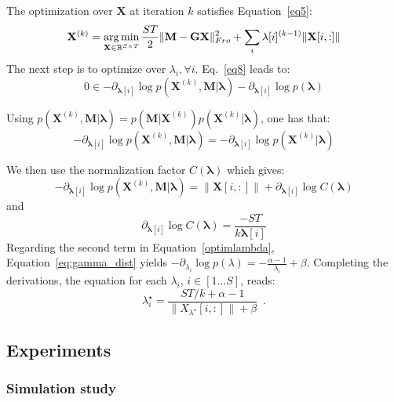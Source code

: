 The optimization over $\mathbf{X}$ at iteration $k$ satisfies Equation~\eqref{eq5}: %
\begin{equation*}	
\mathbf{X}^{(k)}=\mathop{\mathrm{arg}\,\mathrm{min}}_{\mathbf{X}\in\mathbb{R}^{S\times T}} \frac{ST}{2}\|\mathbf{M}-\mathbf{GX}\|_{Fro}^2 + \sum_{i} \mathbf{\lambda}[i]^{(k-1)}\|\mathbf{X}[i,:]\|
\end{equation*}
The next step is to optimize over $\lambda_i, \forall i$. Eq.~\eqref{eq8} leads to:
\begin{equation} \label{optimlambda}
0\in -\partial_{\mathbf{\lambda}[i]} \log p(\mathbf{X}^{(k)},\mathbf{M}|\mathbf{\lambda}) -\partial_{\mathbf{\lambda}[i]} \log p(\mathbf{\lambda})
\end{equation} 

Using $p(\mathbf{X}^{(k)},\mathbf{M}|\mathbf{\lambda})=p(\mathbf{M}|\mathbf{X}^{(k)})p(\mathbf{X}^{(k)}|\mathbf{\lambda})$, one has that:
\begin{equation}
-\partial_{\mathbf{\lambda}[i]} \log p(\mathbf{X}^{(k)}, \mathbf{M}|\mathbf{\lambda}) = -\partial_{\mathbf{\lambda}[i]} \log p(\mathbf{X}^{(k)}|\mathbf{\lambda})
\end{equation}

 We then use the normalization factor $C(\mathbf{\lambda})$ which gives:\\
\begin{equation}
 - \partial_{\mathbf{\lambda}[i]} \log p(\mathbf{X}^{(k)}, \mathbf{M}|\mathbf{\lambda})=\|\mathbf{X}[i,:]\| + \partial_{\mathbf{\lambda}[i]} \log C(\mathbf{\lambda})
\end{equation}
 and 
\begin{equation} 
 \partial_{\mathbf{\lambda}[i]} \log C(\mathbf{\lambda})=\frac{-ST}{k\mathbf{\lambda}[i]}
\end{equation}
  Regarding the second term in Equation~\eqref{optimlambda}, Equation~\eqref{eq:gamma_dist} yields $-\partial_{\lambda_i} \log p(\lambda) = -\frac{\alpha-1}{\lambda_i} + \beta$.
Completing the derivations, the equation for each $\lambda_i$, $i\in[1\dots S]$, reads:
\begin{equation} \label{eq9}
\lambda^\star_i=\frac{ST/k + \alpha - 1}{\|X_{\lambda^\star}[i,:]\| + \beta} \enspace .
\end{equation}

\subsection{Experiments}
\subsubsection{Simulation study}

